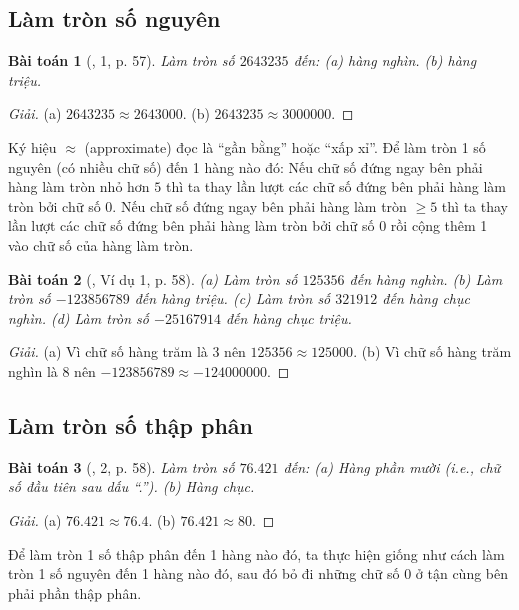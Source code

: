 \documentclass{article}
\newtheorem{baitoan}{Bài toán}
\begin{document}
\subsection{Làm tròn số nguyên}

\begin{baitoan}[\cite{SGK_Toan_6_Canh_Dieu_tap_2}, 1, p. 57]
	Làm tròn số $2643235$ đến: (a) hàng nghìn. (b) hàng triệu.
\end{baitoan}

\begin{proof}[Giải]
	(a) $2643235\approx2643000$. (b) $2643235\approx3000000$.
\end{proof}
Ký hiệu $\approx$ (approximate) đọc là ``gần bằng'' hoặc ``xấp xỉ''. Để làm tròn 1 số nguyên (có nhiều chữ số) đến 1 hàng nào đó: Nếu chữ số đứng ngay bên phải hàng làm tròn nhỏ hơn $5$ thì ta thay lần lượt các chữ số đứng bên phải hàng làm tròn bởi chữ số 0. Nếu chữ số đứng ngay bên phải hàng làm tròn $\ge5$ thì ta thay lần lượt các chữ số đứng bên phải hàng làm tròn bởi chữ số 0 rồi cộng thêm 1 vào chữ số của hàng làm tròn.

\begin{baitoan}[\cite{SGK_Toan_6_Canh_Dieu_tap_2}, Ví dụ 1, p. 58]
	(a) Làm tròn số $125356$ đến hàng nghìn. (b) Làm tròn số $-123856789$ đến hàng triệu. (c) Làm tròn số $321912$ đến hàng chục nghìn. (d) Làm tròn số $-25167914$ đến hàng chục triệu.
\end{baitoan}

\begin{proof}[Giải]
	(a) Vì chữ số hàng trăm là 3 nên $125356\approx125000$. (b) Vì chữ số hàng trăm nghìn là 8 nên $-123856789\approx-124000000$.
\end{proof}

\subsection{Làm tròn số thập phân}

\begin{baitoan}[\cite{SGK_Toan_6_Canh_Dieu_tap_2}, 2, p. 58]
	Làm tròn số $76.421$ đến: (a) Hàng phần mười (i.e., chữ số đầu tiên sau dấu ``.''). (b) Hàng chục.
\end{baitoan}

\begin{proof}[Giải]
	(a) $76.421\approx76.4$. (b) $76.421\approx80$.
\end{proof}
Để làm tròn 1 số thập phân đến 1 hàng nào đó, ta thực hiện giống như cách làm tròn 1 số nguyên đến 1 hàng nào đó, sau đó bỏ đi những chữ số 0 ở tận cùng bên phải phần thập phân.
\end{document}
